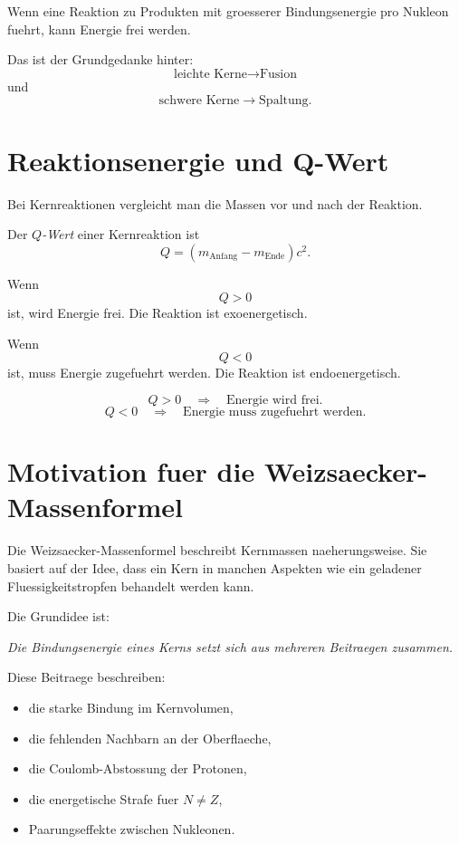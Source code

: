 \begin{examtipbox}
Wenn eine Reaktion zu Produkten mit groesserer Bindungsenergie pro Nukleon fuehrt,
kann Energie frei werden.

Das ist der Grundgedanke hinter:
\[
    \text{leichte Kerne} \rightarrow \text{Fusion}
\]
und
\[
    \text{schwere Kerne} \rightarrow \text{Spaltung}.
\]
\end{examtipbox}

\section{Reaktionsenergie und Q-Wert}

Bei Kernreaktionen vergleicht man die Massen vor und nach der Reaktion.

\begin{definitionbox}
Der \emph{$Q$-Wert} einer Kernreaktion ist
\[
    Q
    =
    \left(
        m_{\mathrm{Anfang}} - m_{\mathrm{Ende}}
    \right)c^2.
\]
\end{definitionbox}

\begin{conceptbox}
Wenn
\[
    Q>0
\]
ist, wird Energie frei.
Die Reaktion ist exoenergetisch.

Wenn
\[
    Q<0
\]
ist, muss Energie zugefuehrt werden.
Die Reaktion ist endoenergetisch.
\end{conceptbox}

\begin{formulabox}
\[
    Q>0
    \quad\Longrightarrow\quad
    \text{Energie wird frei}.
\]
\[
    Q<0
    \quad\Longrightarrow\quad
    \text{Energie muss zugefuehrt werden}.
\]
\end{formulabox}

\section{Motivation fuer die Weizsaecker-Massenformel}

Die Weizsaecker-Massenformel beschreibt Kernmassen naeherungsweise.
Sie basiert auf der Idee, dass ein Kern in manchen Aspekten wie ein geladener
Fluessigkeitstropfen behandelt werden kann.

\begin{conceptbox}
Die Grundidee ist:
\begin{center}
\emph{Die Bindungsenergie eines Kerns setzt sich aus mehreren Beitraegen zusammen.}
\end{center}

Diese Beitraege beschreiben:
\begin{itemize}
    \item die starke Bindung im Kernvolumen,
    \item die fehlenden Nachbarn an der Oberflaeche,
    \item die Coulomb-Abstossung der Protonen,
    \item die energetische Strafe fuer $N\neq Z$,
    \item Paarungseffekte zwischen Nukleonen.
\end{itemize}
\end{conceptbox}

